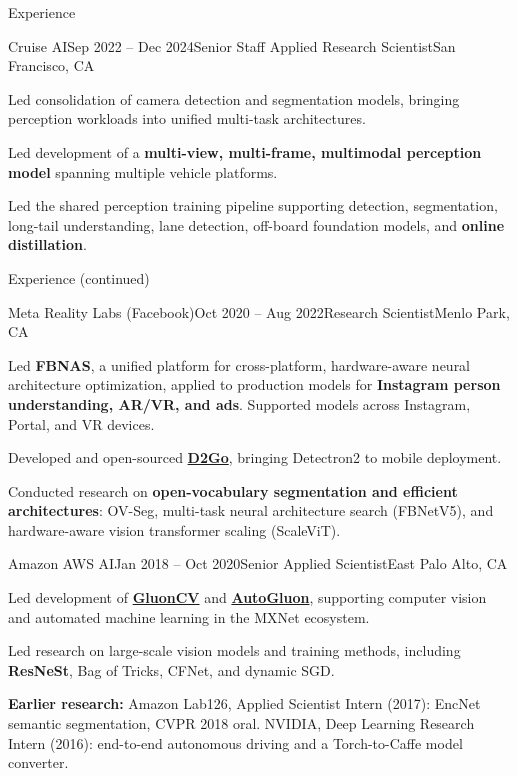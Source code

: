 \documentclass{resume}
\begin{document}
\begin{rSection}{Experience}
\begin{rSubsection}{Cruise AI}{Sep 2022 -- Dec 2024}{Senior Staff Applied Research Scientist}{San Francisco, CA}
\item Led consolidation of camera detection and segmentation models, bringing perception workloads into unified multi-task architectures.
\item Led development of a \textbf{multi-view, multi-frame, multimodal perception model} spanning multiple vehicle platforms.
\item Led the shared perception training pipeline supporting detection, segmentation, long-tail understanding, lane detection, off-board foundation models, and \textbf{online distillation}.
\end{rSubsection}
\end{rSection}

\newpage
\begin{rSection}{Experience (continued)}
\begin{rSubsection}{Meta Reality Labs (Facebook)}{Oct 2020 -- Aug 2022}{Research Scientist}{Menlo Park, CA}
\item Led \textbf{FBNAS}, a unified platform for cross-platform, hardware-aware neural architecture optimization, applied to production models for \textbf{Instagram person understanding, AR/VR, and ads}. Supported models across Instagram, Portal, and VR devices.
\item Developed and open-sourced \href{https://ai.facebook.com/blog/d2go-brings-detectron2-to-mobile/}{\textbf{D2Go}}, bringing Detectron2 to mobile deployment.
\item Conducted research on \textbf{open-vocabulary segmentation and efficient architectures}: OV-Seg, multi-task neural architecture search (FBNetV5), and hardware-aware vision transformer scaling (ScaleViT).
\end{rSubsection}

\begin{rSubsection}{Amazon AWS AI}{Jan 2018 -- Oct 2020}{Senior Applied Scientist}{East Palo Alto, CA}
\item Led development of \href{https://cv.gluon.ai/contents.html}{\textbf{GluonCV}} and \href{https://auto.gluon.ai/stable/index.html}{\textbf{AutoGluon}}, supporting computer vision and automated machine learning in the MXNet ecosystem.
\item Led research on large-scale vision models and training methods, including \textbf{ResNeSt}, Bag of Tricks, CFNet, and dynamic SGD.
\end{rSubsection}
\textbf{Earlier research:} Amazon Lab126, Applied Scientist Intern (2017): EncNet semantic segmentation, CVPR 2018 oral. NVIDIA, Deep Learning Research Intern (2016): end-to-end autonomous driving and a Torch-to-Caffe model converter.
\end{rSection}
\end{document}
